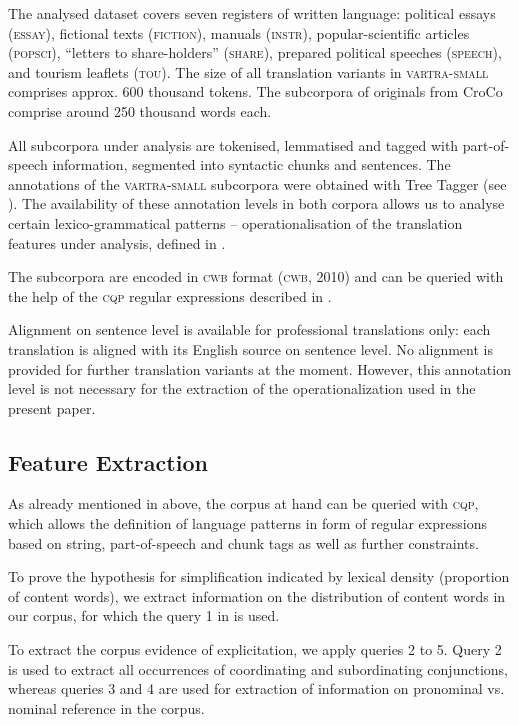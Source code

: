 \documentclass[output=paper]{LSP/langsci}
\begin{document}
The analysed dataset covers seven registers of written language: political essays (\textsc{essay}), fictional texts (\textsc{fiction}), manuals (\textsc{instr}), popular-scientific articles (\textsc{popsci}), “letters to share-holders” (\textsc{share}), prepared political speeches (\textsc{speech}), and tourism leaflets (\textsc{tou}). The size of all translation variants in \textsc{vartra}-\textsc{small} comprises approx. 600 thousand tokens.  The subcorpora of originals from CroCo comprise around 250 thousand words each.

All subcorpora under analysis are tokenised, lemmatised and tagged with part-of-speech information, segmented into syntactic chunks and sentences.  The annotations of the \textsc{vartra}-\textsc{small} subcorpora were obtained with Tree Tagger (see \citealt{Schmid1994}). The availability of these annotation levels in both corpora allows us to analyse certain lexico-grammatical patterns – operationalisation of the translation features under analysis, defined in .

The subcorpora are encoded in \textsc{cwb} format (\textsc{cwb}, 2010) and can be queried with the help of the \textsc{cqp} regular expressions described in \citet{Evert2005}.

Alignment on sentence level is available for professional translations only: each translation is aligned with its English source on sentence level.  No alignment is provided for further translation variants at the moment. However, this annotation level is not necessary for the extraction of the operationalization used in the present paper.

\subsection{Feature Extraction}
As already mentioned in  above, the corpus at hand can be queried with \textsc{cqp}, which allows the definition of language patterns in form of regular expressions based on string, part-of-speech and chunk tags as well as further constraints.

To prove the hypothesis for simplification indicated by lexical density (proportion of content words), we extract information on the distribution of content words in our corpus, for which the query 1 in  is used.

To extract the corpus evidence of explicitation, we apply queries 2 to 5. Query 2 is used to extract all occurrences of coordinating and subordinating conjunctions, whereas queries 3 and 4 are used for extraction of information on pronominal vs. nominal reference in the corpus. 
\end{document}
